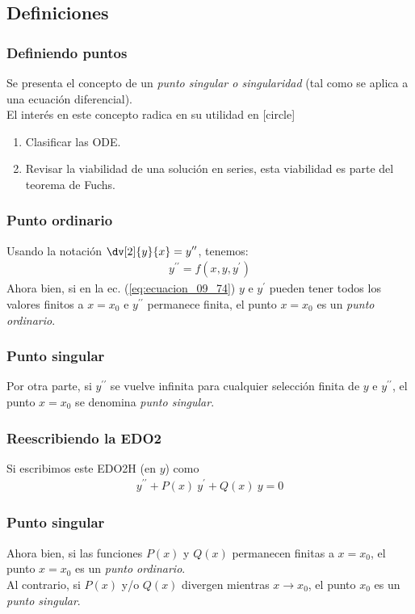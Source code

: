 \subsection{Definiciones}
\begin{frame}
\frametitle{Definiendo puntos}
Se presenta el concepto de un \emph{punto singular o singularidad} (tal como se aplica a una ecuación diferencial).
\\
\bigskip
El interés en este concepto radica en su utilidad en
[circle]
\begin{enumerate}[<+->]
\item Clasificar las ODE.
\item Revisar la viabilidad de una solución en series, esta viabilidad es parte del teorema de Fuchs.
\end{enumerate}
\end{frame}
\begin{frame}
\frametitle{Punto ordinario}
Usando la notación $\displaystyle \dv[2]{y}{x} = y^{\prime \prime}$, tenemos:
\begin{align}
y^{\prime \prime} = f(x, y, y^{\prime})
\label{eq:ecuacion_09_74}
\end{align}
Ahora bien, si en la ec. (\ref{eq:ecuacion_09_74}) $y$ e $y^{\prime}$ pueden tener todos los valores finitos a $x = x_{0}$ e $y^{\prime \prime}$ permanece finita, el punto $x = x_{0}$ es un \emph{punto ordinario}.
\end{frame}
\begin{frame}
\frametitle{Punto singular}
Por otra parte, si $y^{\prime \prime}$ se vuelve infinita para cualquier selección finita de $y$ e  $y^{\prime \prime}$, el punto $x = x_{0}$ se denomina \emph{punto singular}.
\end{frame}
\begin{frame}
\frametitle{Reescribiendo la EDO2}
Si escribimos este EDO2H (en $y$) como
\begin{align}
y^{\prime \prime} + P(x) \: y^{\prime} + Q(x) \: y = 0
\label{eq:ecuacion_09_75}
\end{align}
\end{frame}
\begin{frame}
\frametitle{Punto singular}
Ahora bien, si las funciones $P(x)$ y $Q(x)$ permanecen finitas a $x = x_{0}$, el punto $x = x_{0}$ es un \emph{punto ordinario}.
\\
\bigskip
\pause
Al contrario, si $P(x)$ y/o $Q(x)$ divergen mientras $x \to x_{0}$, el punto $x_{0}$ es un \emph{punto singular}.
\end{frame}
